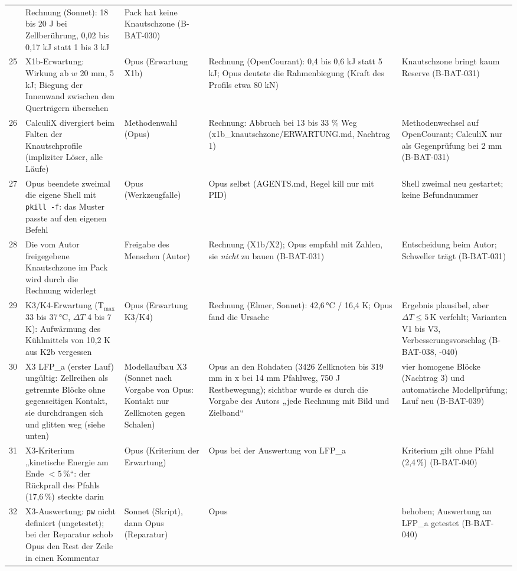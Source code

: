 \documentclass[10pt,a4paper]{article}
\begin{document}
\begin{longtable}{@{}p{0.4cm}p{3.6cm}p{2.5cm}p{4.4cm}p{3.0cm}@{}}
 & Rechnung (Sonnet): 18 bis 20 J bei Zellberührung, 0,02 bis 0,17 kJ statt 1 bis 3 kJ & Pack hat keine Knautschzone (B-BAT-030)\\
25 & X1b-Erwartung: Wirkung ab $w$ 20 mm, 5 kJ; Biegung der Innenwand zwischen den Querträgern übersehen & Opus (Erwartung X1b)
 & Rechnung (OpenCourant): 0,4 bis 0,6 kJ statt 5 kJ; Opus deutete die Rahmenbiegung (Kraft des Profils etwa 80 kN) & Knautschzone bringt kaum Reserve (B-BAT-031)\\
26 & CalculiX divergiert beim Falten der Knautschprofile (impliziter Löser, alle Läufe) & Methodenwahl (Opus)
 & Rechnung: Abbruch bei 13 bis 33 \% Weg (x1b\_knautschzone/ERWARTUNG.md, Nachtrag 1) & Methodenwechsel auf OpenCourant; CalculiX nur als Gegenprüfung bei 2 mm (B-BAT-031)\\
27 & Opus beendete zweimal die eigene Shell mit \texttt{pkill -f}: das Muster passte auf den eigenen Befehl & Opus (Werkzeugfalle)
 & Opus selbst (AGENTS.md, Regel kill nur mit PID) & Shell zweimal neu gestartet; keine Befundnummer\\
28 & Die vom Autor freigegebene Knautschzone im Pack wird durch die Rechnung widerlegt & Freigabe des Menschen (Autor)
 & Rechnung (X1b/X2); Opus empfahl mit Zahlen, sie \emph{nicht} zu bauen (B-BAT-031) & Entscheidung beim Autor; Schweller trägt (B-BAT-031)\\
29 & K3/K4-Erwartung (T$_{\max}$ 33 bis 37\,°C, $\Delta T$ 4 bis 7 K): Aufwärmung des Kühlmittels von 10,2 K aus K2b vergessen & Opus (Erwartung K3/K4)
 & Rechnung (Elmer, Sonnet): 42,6\,°C / 16,4 K; Opus fand die Ursache & Ergebnis plausibel, aber $\Delta T\le5$\,K verfehlt; Varianten V1 bis V3, Verbesserungsvorschlag (B-BAT-038, -040)\\
30 & X3 LFP\_a (erster Lauf) ungültig: Zellreihen als getrennte Blöcke ohne gegenseitigen Kontakt, sie durchdrangen sich und glitten weg (siehe unten) & Modellaufbau X3 (Sonnet nach Vorgabe von Opus: Kontakt nur Zellknoten gegen Schalen)
 & Opus an den Rohdaten (3426 Zellknoten bis 319 mm in x bei 14 mm Pfahlweg, 750 J Restbewegung); sichtbar wurde es durch die Vorgabe des Autors „jede Rechnung mit Bild und Zielband“ & vier homogene Blöcke (Nachtrag 3) und automatische Modellprüfung; Lauf neu (B-BAT-039)\\
31 & X3-Kriterium „kinetische Energie am Ende $<5$\,\%“: der Rückprall des Pfahls (17,6\,\%) steckte darin & Opus (Kriterium der Erwartung)
 & Opus bei der Auswertung von LFP\_a & Kriterium gilt ohne Pfahl (2,4\,\%) (B-BAT-040)\\
32 & X3-Auswertung: \texttt{pw} nicht definiert (ungetestet); bei der Reparatur schob Opus den Rest der Zeile in einen Kommentar & Sonnet (Skript), dann Opus (Reparatur)
 & Opus & behoben; Auswertung an LFP\_a getestet (B-BAT-040)\\
\bottomrule
\end{longtable}
\end{document}
